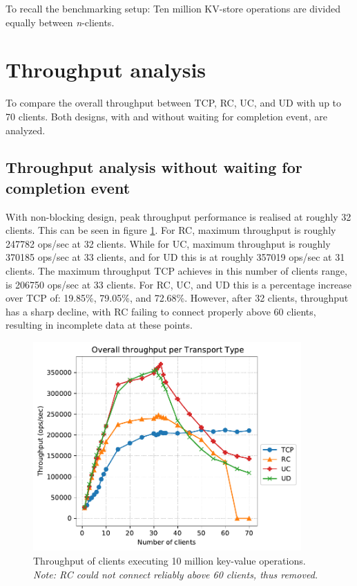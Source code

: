 To recall the benchmarking setup:
Ten million KV-store operations are divided equally between \textit{n}-clients.

\section{Throughput analysis}\label{sec:throughput-analysis}
To compare the overall throughput between TCP, RC, UC, and UD with up to 70 clients.
Both designs, with and without waiting for completion event, are analyzed.

\subsection{Throughput analysis without waiting for completion event}
With non-blocking design, peak throughput performance is realised at roughly 32 clients.
This can be seen in figure \ref{fig:throughput-70}.
For RC, maximum throughput is roughly 247782 ops/sec at 32 clients.
While for UC, maximum throughput is roughly 370185 ops/sec at 33 clients, and for UD this is at roughly 357019 ops/sec at 31 clients.
The maximum throughput TCP achieves in this number of clients range, is 206750 ops/sec at 33 clients.
For RC, UC, and UD this is a percentage increase over TCP of: 19.85\%, 79.05\%, and 72.68\%.
However, after 32 clients, throughput has a sharp decline, with RC failing to connect properly above 60 clients, resulting in incomplete data at these points.
\begin{figure}
    \centering
    \includegraphics[height=8cm]{figures/PDF/Throughput_70}
    \caption[Throughput of clients executing 10 million key-value operations.]{Throughput of clients executing 10 million key-value operations. \textit{Note: RC could not connect reliably above 60 clients, thus removed.}}
    \label{fig:throughput-70}
\end{figure}

